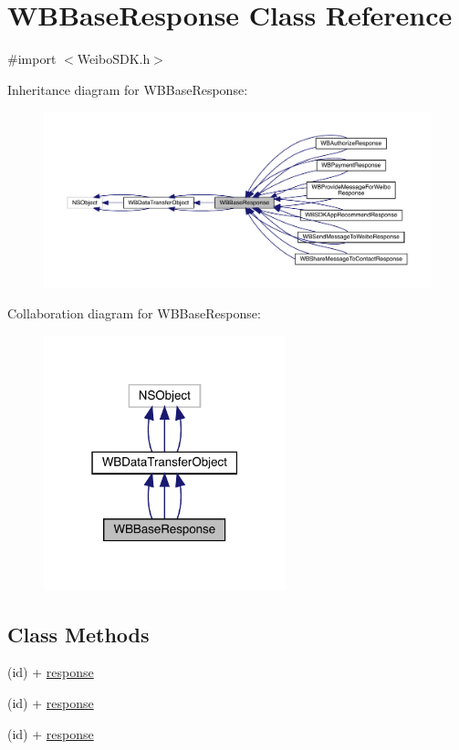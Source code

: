 \hypertarget{interface_w_b_base_response}{}\section{W\+B\+Base\+Response Class Reference}
\label{interface_w_b_base_response}


{\ttfamily \#import $<$Weibo\+S\+D\+K.\+h$>$}



Inheritance diagram for W\+B\+Base\+Response\+:\nopagebreak
\begin{figure}[H]
\begin{center}
\leavevmode
\includegraphics[width=350pt]{interface_w_b_base_response__inherit__graph}
\end{center}
\end{figure}


Collaboration diagram for W\+B\+Base\+Response\+:\nopagebreak
\begin{figure}[H]
\begin{center}
\leavevmode
\includegraphics[width=199pt]{interface_w_b_base_response__coll__graph}
\end{center}
\end{figure}
\subsection*{Class Methods}
\begin{DoxyCompactItemize}
\item 
(id) + \mbox{\hyperlink{interface_w_b_base_response_adbd83297d349925f1964bc854589da24}{response}}
\item 
(id) + \mbox{\hyperlink{interface_w_b_base_response_adbd83297d349925f1964bc854589da24}{response}}
\item 
(id) + \mbox{\hyperlink{interface_w_b_base_response_adbd83297d349925f1964bc854589da24}{response}}
\end{DoxyCompactItemize}
